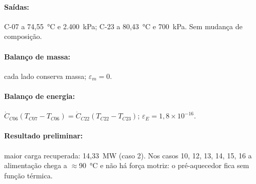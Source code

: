 \documentclass[11pt,a4paper]{article}
\numberwithin{equation}{section}
\numberwithin{table}{section}
\numberwithin{figure}{section}
\begin{document}
\paragraph{Saídas:} C-07 a 74,55~\si{\celsius} e 2.400~\si{\kilo\pascal}; C-23 a 80,43~\si{\celsius} e 700~\si{\kilo\pascal}. Sem mudança de composição.
\paragraph{Balanço de massa:} cada lado conserva massa; $\varepsilon_m=$$0$.
\paragraph{Balanço de energia:} $\dot C_{C06}(T_{C07}-T_{C06})=\dot C_{C22}(T_{C22}-T_{C23})$; $\varepsilon_E=$$1{,}8\times10^{-16}$.
\paragraph{Resultado preliminar:} maior carga recuperada: 14,33~\si{\mega\watt} (caso 2). Nos casos 10, 12, 13, 14, 15, 16 a alimentação chega a $\approx$90~\si{\celsius} e não há força motriz: o pré-aquecedor fica sem função térmica.
\end{document}
